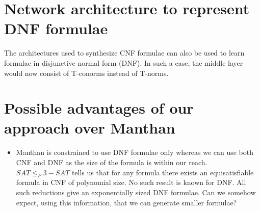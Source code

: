 \section{Network architecture to represent DNF formulae}

The architectures used to synthesize CNF formulae can also be used to learn formulae in disjunctive normal form (DNF).  In such a case, the middle layer would now consist of T-conorms instead of T-norms.

\section{Possible advantages of our approach over Manthan}
\begin{itemize}
\item Manthan is constrained to use DNF formulae only whereas we can use both CNF and DNF as the size of the formula is within our reach.  $SAT \leq_P 3-SAT$ tells us that for any formula there exists an equisatisfiable formula in CNF of polynomial size.  No  such result is known for DNF.  All such reductions give an exponentially sized DNF formulae. Can we somehow expect, using this information, that we can generate smaller formulae?

\end{itemize}